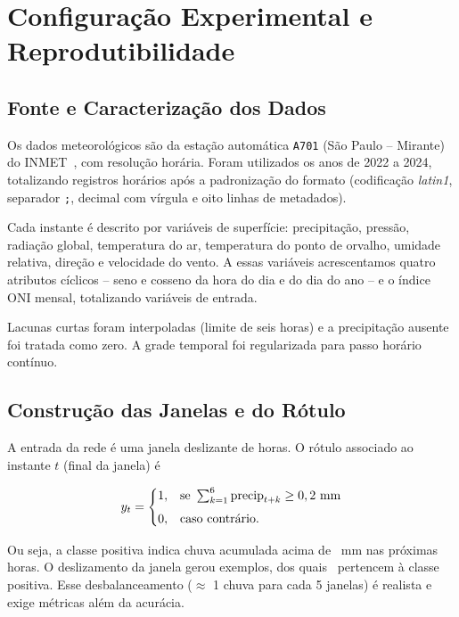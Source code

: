 \documentclass[11pt,a4paper]{article}
\begin{document}
\section{Configuração Experimental e Reprodutibilidade}

\subsection{Fonte e Caracterização dos Dados}

Os dados meteorol{\'o}gicos s{\~a}o da esta{\c c}{\~a}o autom{\'a}tica
\texttt{A701} (S{\~a}o Paulo -- Mirante) do INMET~\cite{inmet}, com
resolu{\c c}{\~a}o hor{\'a}ria. Foram utilizados os anos de 2022 a 2024,
totalizando \NREG{} registros hor{\'a}rios ap{\'o}s a padroniza{\c c}{\~a}o
do formato (codifica{\c c}{\~a}o \textit{latin1}, separador \texttt{;},
decimal com v{\'i}rgula e oito linhas de metadados).

Cada instante {\'e} descrito por vari{\'a}veis de superf{\'i}cie:
precipita{\c c}{\~a}o, press{\~a}o, radia{\c c}{\~a}o global, temperatura do
ar, temperatura do ponto de orvalho, umidade relativa, dire{\c c}{\~a}o e
velocidade do vento. A essas vari{\'a}veis acrescentamos quatro atributos
c{\'i}clicos -- seno e cosseno da hora do dia e do dia do ano -- e o
{\'i}ndice ONI mensal, totalizando \NFEAT{} vari{\'a}veis de entrada.

Lacunas curtas foram interpoladas (limite de seis horas) e a
precipita{\c c}{\~a}o ausente foi tratada como zero. A grade temporal foi
regularizada para passo hor{\'a}rio cont{\'i}nuo.

\subsection{Construção das Janelas e do Rótulo}

A entrada da rede {\'e} uma janela deslizante de \WINDOW{} horas. O
r{\'o}tulo associado ao instante $t$ (final da janela) {\'e}

\[
y_t =
\begin{cases}
1, & \text{se } \sum_{k=1}^{6} \text{precip}_{t+k} \ge
0,2\ \text{mm} \\[0.4em]
0, & \text{caso contr{\'a}rio.}
\end{cases}
\]

Ou seja, a classe positiva indica chuva acumulada acima de \RAINTH\ mm nas
pr{\'o}ximas \HORIZON{} horas. O deslizamento da janela gerou \NWIN{} exemplos,
dos quais \POSRATE\ pertencem {\`a} classe positiva. Esse desbalanceamento
($\approx$ 1 chuva para cada 5 janelas) {\'e} realista e exige m{\'e}tricas
al{\'e}m da acur{\'a}cia.
\end{document}
